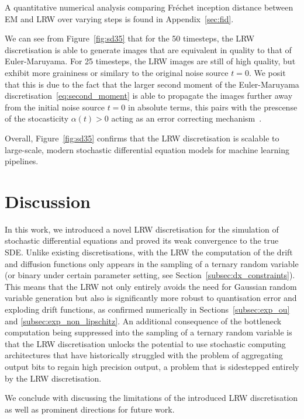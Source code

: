 \documentclass[pra,showpacs,amsmath,amssymb,amsfonts,lengthcheck,longbibliography,onecolumn]{revtex4-2}
\begin{document}
A quantitative numerical analysis comparing Fréchet inception distance between EM and LRW over varying steps is found in Appendix~\ref{sec:fid}.

We can see from Figure~\ref{fig:sd35} that for the 50 timesteps, the LRW discretisation
is able to generate images that are equivalent in quality to that of Euler-Maruyama.
For 25 timesteps, the LRW images are still of high quality, but exhibit more graininess
or similary to the original noise source $t=0$. We posit that this is due to the fact that
the larger second moment of the Euler-Maruyama discretisation~\eqref{eq:second_moment}
is able to propagate the images further away from the initial noise source $t=0$ in
absolute terms, this pairs with the prescense of the stocasticity $\alpha(t) > 0$ acting
as an error correcting mechanism~\cite{schaeffer2025effect}.

Overall, Figure~\ref{fig:sd35} confirms that the LRW discretisation is scalable to
large-scale, modern stochastic differential equation models for machine learning pipelines.


\section{Discussion}\label{sec:discussion}

In this work, we introduced a novel LRW discretisation
for the simulation of stochastic differential equations and proved its weak convergence
to the true SDE. Unlike existing discretisations,
with the LRW the computation of the drift and diffusion functions only
appears in the sampling of a ternary random variable (or binary under certain parameter
setting, see Section~\ref{subsec:dx_constraints}). This means that the LRW
not only entirely avoids the need for Gaussian random variable generation but also
is significantly more robust to quantisation error and exploding drift functions,
as confirmed numerically in Sections~\ref{subsec:exp_ou} and \ref{subsec:exp_non_lipschitz}.
An additional consequence of the bottleneck computation being suppressed into the sampling
of a ternary random variable is that the LRW discretisation unlocks the
potential to use stochastic computing architectures that have historically struggled with
the problem of aggregating output bits to regain high precision output, a problem that
is sidestepped entirely by the LRW discretisation.

We conclude with discussing the limitations of the introduced LRW discretisation
as well as prominent directions for future work.
\end{document}

